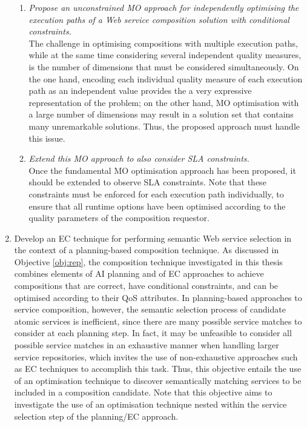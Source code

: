 \begin{enumerate}
   \begin{enumerate}
    \item \label{obj:simple-mo} \emph{Propose an unconstrained MO approach for independently optimising the execution paths of a Web service composition solution with conditional constraints.}\\
    The challenge in optimising compositions with multiple execution paths, while at the same time considering several independent quality measures, is the number of dimensions that must be considered simultaneously. On the one hand, encoding each individual quality measure of each execution path as an independent value provides the a very expressive representation of the problem; on the other hand, MO optimisation with a large number of dimensions may result in a solution set that contains many unremarkable solutions. Thus, the proposed approach must handle this issue.
    \item \label{obj:sla-mo} \emph{Extend this MO approach to also consider SLA constraints.}\\
    Once the fundamental MO optimisation approach has been proposed, it should be extended to observe SLA constraints. Note that these constraints must be enforced for each execution path individually, to ensure that all runtime options have been optimised according to the quality parameters of the composition requestor.
   \end{enumerate}
 
 \item \label{obj:semantic} Develop an EC technique for performing semantic Web service selection in the context of a planning-based composition technique. As discussed in Objective \ref{obj:rep}, the composition technique investigated in this thesis combines elements of AI planning and of EC approaches to achieve compositions that are correct, have conditional constraints, and can be optimised according to their QoS attributes. In planning-based approaches to service composition, however, the semantic selection process of candidate atomic services is inefficient, since there are many possible service matches to consider at each planning step. In fact, it may be unfeasible to consider all possible service matches in an exhaustive manner when handling larger service repositories, which invites the use of non-exhaustive approaches such as EC techniques to accomplish this task. Thus, this objective entails the use of an optimisation technique to discover semantically matching services to be included in a composition candidate. Note that this objective aims to investigate the use of an optimisation technique nested within the service selection step of the planning/EC approach.
 

\end{enumerate}
